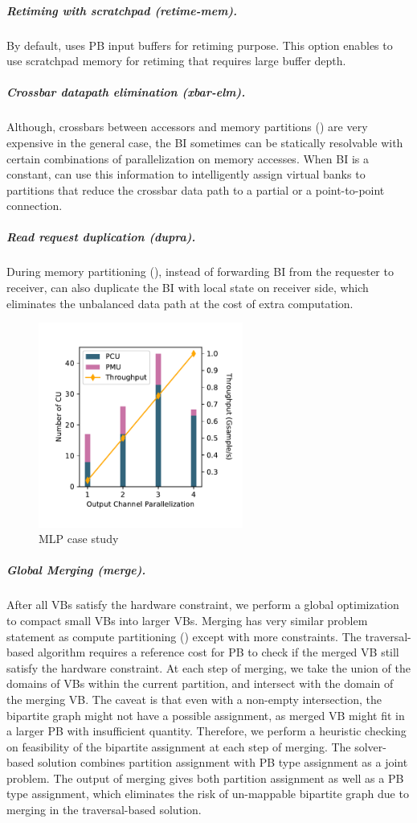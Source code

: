 \subparagraph{Retiming with scratchpad (retime-mem).} By default, \name{} uses PB input buffers for retiming purpose. 
This option enables \name{} to use scratchpad memory for retiming that requires large buffer depth.

\subparagraph{Crossbar datapath elimination (xbar-elm).}
Although, crossbars between accessors and memory partitions () are very expensive in the general case, the BI sometimes can be statically resolvable with certain combinations of parallelization on memory accesses. 
When BI is a constant, \name{} can use this information to intelligently assign virtual banks to partitions that reduce the crossbar data path to a partial or a point-to-point connection.

\subparagraph{Read request duplication (dupra).} During memory partitioning (), instead of forwarding BI from the requester to receiver, \name{} can also duplicate the BI with local state on receiver side, which
eliminates the unbalanced data path at the cost of extra computation.

\begin{figure}
\centering
\includegraphics[width=0.6\textwidth]{figs/mlp.pdf}
\caption[MLP case study]{
  MLP case study
}
\label{fig:mlp}
\end{figure}

\subparagraph{Global Merging (merge).}
After all VBs satisfy the hardware constraint, we perform a global optimization to compact small VBs into  larger VBs. 
Merging has very similar problem statement as compute partitioning () except with more constraints.
The traversal-based algorithm requires a reference cost for PB to check if the merged VB still satisfy the hardware constraint.
At each step of merging, we take the union of the domains of VBs within the current partition, and intersect with the domain of the merging VB.
The caveat is that even with a non-empty intersection, the bipartite graph might not have a possible assignment, as merged VB might fit in a larger PB with insufficient quantity.
Therefore, we perform a heuristic checking on feasibility of the bipartite assignment at each step of merging.
The solver-based solution combines partition assignment with PB type assignment as a joint problem. 
The output of merging gives both partition assignment as well as a PB type assignment, which eliminates the risk of un-mappable bipartite graph due to merging in the traversal-based solution.


